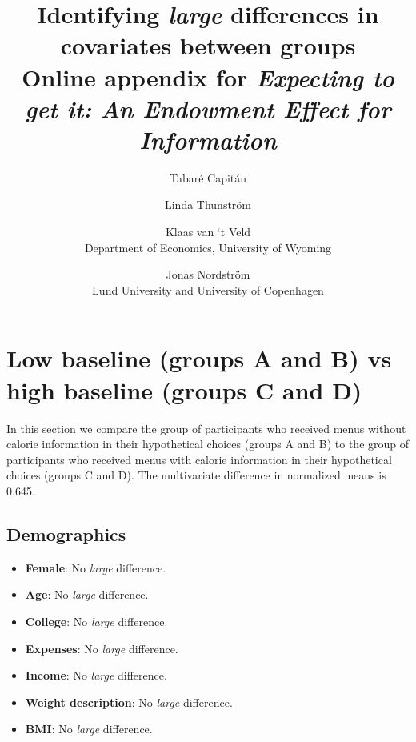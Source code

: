 \documentclass[12pt]{article}
\begin{document}
\title{
Identifying \emph{large} differences in covariates between groups\\[0.2em]\footnotesize{}Online appendix for \emph{Expecting to get it: An Endowment Effect for Information}}


\author{Tabaré Capitán
        \and
        Linda Thunström
        \and
        Klaas van ‘t Veld
          \\ \small{Department of Economics, University of Wyoming}
        \and
        Jonas Nordström
          \\ \small{Lund University and University of Copenhagen}
        }
\maketitle

\thispagestyle{empty}   %

\clearpage

\tableofcontents

\clearpage

\section{Low baseline (groups A and B) vs high baseline (groups C and D)}

In this section we compare the group of participants who received menus without calorie information in their hypothetical choices (groups A and B) to the group of participants who received menus with calorie information in their hypothetical choices (groups C and D). The multivariate difference in normalized means is 0.645.

\subsection{Demographics}

\begin{itemize}
  \item \textbf{Female}: No \emph{large} difference.

  \item \textbf{Age}: No \emph{large} difference.

  \item \textbf{College}: No \emph{large} difference.

  \item \textbf{Expenses}: No \emph{large} difference.

  \item \textbf{Income}: No \emph{large} difference.

  \item \textbf{Weight description}: No \emph{large} difference.

  \item \textbf{BMI}: No \emph{large} difference.
\end{itemize}
\end{document}
